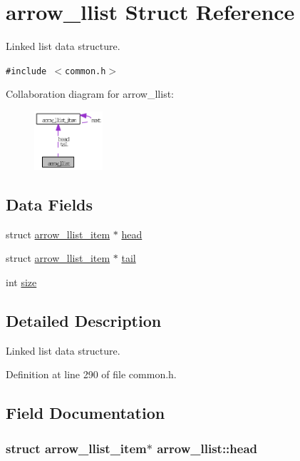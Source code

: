 \hypertarget{structarrow__llist}{
\section{arrow\_\-llist Struct Reference}
\label{structarrow__llist}
}
Linked list data structure.  


{\tt \#include $<$common.h$>$}

Collaboration diagram for arrow\_\-llist:\nopagebreak
\begin{figure}[H]
\begin{center}
\leavevmode
\includegraphics[width=72pt]{structarrow__llist__coll__graph}
\end{center}
\end{figure}
\subsection*{Data Fields}
\begin{CompactItemize}
\item 
struct \hyperlink{structarrow__llist__item}{arrow\_\-llist\_\-item} $\ast$ \hyperlink{structarrow__llist_cd27eb82097c41cb5e7ba68560073904}{head}
\item 
struct \hyperlink{structarrow__llist__item}{arrow\_\-llist\_\-item} $\ast$ \hyperlink{structarrow__llist_17aad561a27cd835fef598e8ffd135c8}{tail}
\item 
int \hyperlink{structarrow__llist_89bdc72883d1d24717445c8087b6b0dc}{size}
\end{CompactItemize}


\subsection{Detailed Description}
Linked list data structure. 

Definition at line 290 of file common.h.

\subsection{Field Documentation}
\hypertarget{structarrow__llist_cd27eb82097c41cb5e7ba68560073904}{
\subsubsection{\setlength{\rightskip}{0pt plus 5cm}struct {\bf arrow\_\-llist\_\-item}$\ast$ {\bf arrow\_\-llist::head}}}
\label{structarrow__llist_cd27eb82097c41cb5e7ba68560073904}


